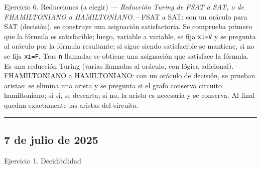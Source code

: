 \documentclass[12pt]{book} %
\begin{document}
Ejercicio 6. Reducciones (a elegir) --- \emph{Reducción Turing de FSAT a
SAT, o de FHAMILTONIANO a HAMILTONIANO.} - FSAT a SAT: con un oráculo
para SAT (decisión), se construye una asignación satisfactoria. Se
comprueba primero que la fórmula es satisfacible; luego, variable a
variable, se fija \texttt{xi=V} y se pregunta al oráculo por la fórmula
resultante; si sigue siendo satisfacible se mantiene, si no se fija
\texttt{xi=F}. Tras \texttt{n} llamadas se obtiene una asignación que
satisface la fórmula. Es una reducción Turing (varias llamadas al
oráculo, con lógica adicional). - FHAMILTONIANO a HAMILTONIANO: con un
oráculo de decisión, se prueban aristas: se elimina una arista y se
pregunta si el grafo conserva circuito hamiltoniano; si sí, se descarta;
si no, la arista es necesaria y se conserva. Al final quedan exactamente
las aristas del circuito.

\begin{center}\rule{0.5\linewidth}{0.5pt}\end{center}

\hypertarget{de-julio-de-2025}{%
\subsection{7 de julio de 2025}\label{de-julio-de-2025}}

Ejercicio 1. Decidibilidad
\end{document}
